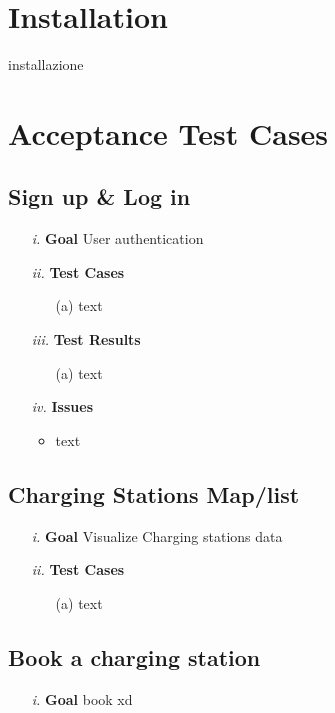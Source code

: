 \documentclass[table, 12pt]{article}
\begin{document}
\section{Installation}
installazione

\section{Acceptance Test Cases}

\subsection{Sign up \& Log in}
\begin{itemize}
    \item[\textit{i.}] \textbf{Goal} User authentication
    \item[\textit{ii.}] \textbf{Test Cases}
    \begin{itemize}
        \item[(a)] text
    \end{itemize} 
    \item[\textit{iii.}] \textbf{Test Results}
    \begin{itemize}
        \item[(a)] text
    \end{itemize} 
    \item[\textit{iv.}] \textbf{Issues}    
    \begin{itemize}
        \item text
    \end{itemize} 
\end{itemize}
\subsection{Charging Stations Map/list}
\begin{itemize}
    \item[\textit{i.}] \textbf{Goal} Visualize Charging stations data
    \item[\textit{ii.}] \textbf{Test Cases}
    \begin{itemize}
        \item[(a)] text
    \end{itemize}
\end{itemize}

\subsection{Book a charging station}
\begin{itemize}
    \item[\textit{i.}] \textbf{Goal} book xd
\end{itemize}
\end{document}
